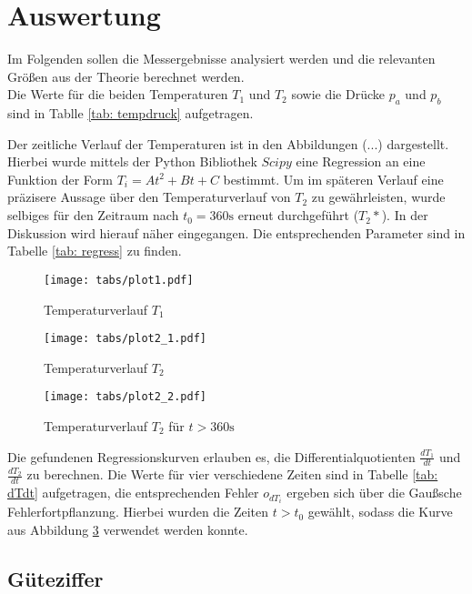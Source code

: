 \section{Auswertung}
Im Folgenden sollen die Messergebnisse analysiert werden und die relevanten Größen aus der Theorie berechnet werden. \\
Die Werte für die beiden Temperaturen $T_1$ und $T_2$ sowie die Drücke $p_a$ und $p_b$ sind in Tablle \ref{tab: tempdruck} aufgetragen.
\FloatBarrier

\FloatBarrier
Der zeitliche Verlauf der Temperaturen ist in den Abbildungen (...) dargestellt. Hierbei wurde mittels der Python Bibliothek $Scipy$ eine %
Regression an eine Funktion der Form $T_i = A t^2 + B t + C$ bestimmt. Um im späteren Verlauf eine präzisere Aussage über den Temperaturverlauf
von $T_2$ zu gewährleisten, wurde selbiges für den Zeitraum nach $t_0 = 360 \si{\second}$ erneut durchgeführt ($T_2*$). In der Diskussion wird hierauf näher eingegangen. Die entsprechenden
Parameter sind in Tabelle \ref{tab: regress} zu finden. \\


\begin{figure}
  \centering
  \texttt{[image: tabs/plot1.pdf]}
  \caption{Temperaturverlauf $T_1$}
  \label{fig: plot1}
\end{figure}

\begin{figure}
  \centering
  \texttt{[image: tabs/plot2\_1.pdf]}
  \caption{Temperaturverlauf $T_2$}
  \label{fig: plot2}
\end{figure}

\begin{figure}
  \centering
  \texttt{[image: tabs/plot2\_2.pdf]}
  \caption{Temperaturverlauf $T_2$ für $t > 360 \si{\second}$}
  \label{fig: plot2*}
\end{figure}


Die gefundenen Regressionskurven erlauben es, die Differentialquotienten $\frac{dT_1}{dt}$ und $\frac{dT_2}{dt}$ zu berechnen. Die Werte für vier verschiedene  Zeiten sind %
in Tabelle \ref{tab: dTdt} aufgetragen, die entsprechenden Fehler $o_{dT_i}$ ergeben sich über die Gaußsche Fehlerfortpflanzung. Hierbei wurden die Zeiten $t > t_0$ gewählt, sodass die Kurve aus Abbildung \ref{fig: plot2*} verwendet werden konnte. %

\subsection{Güteziffer}

